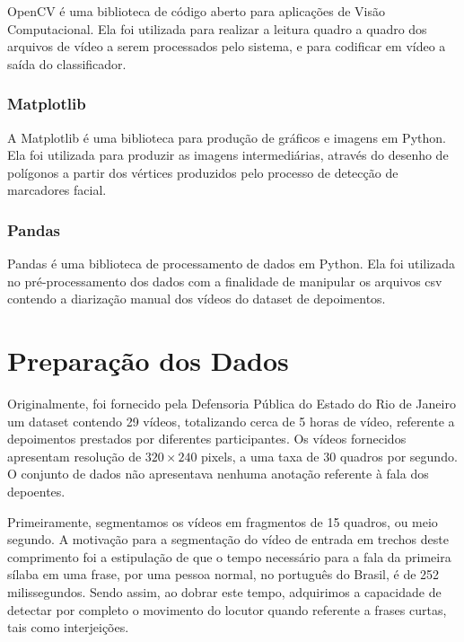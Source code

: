 OpenCV\cite{opencv_library} é uma biblioteca de código aberto para aplicações de Visão Computacional. Ela foi utilizada para realizar a leitura quadro a quadro dos arquivos de vídeo a serem processados pelo sistema, e para codificar em vídeo a saída do classificador.

\subsubsection{Matplotlib}

A Matplotlib\cite{Hunter:2007} é uma biblioteca para produção de gráficos e imagens em Python. Ela foi utilizada para produzir as imagens intermediárias, através do desenho de polígonos a partir dos vértices produzidos pelo processo de detecção de marcadores facial.

\subsubsection{Pandas}

Pandas\cite{mckinney-proc-scipy-2010} é uma biblioteca de processamento de dados em Python. Ela foi utilizada no pré-processamento dos dados com a finalidade de manipular os arquivos csv contendo a diarização manual dos vídeos do dataset de depoimentos.

\section{Preparação dos Dados}
\label{sec:preproc}

Originalmente, foi fornecido pela Defensoria Pública do Estado do Rio de Janeiro um dataset contendo 29 vídeos, totalizando cerca de 5 horas de vídeo, referente a depoimentos prestados por diferentes participantes. Os vídeos fornecidos apresentam resolução de $320\times240$ pixels, a uma taxa de 30 quadros por segundo. O conjunto de dados não apresentava nenhuma anotação referente à fala dos depoentes.

Primeiramente, segmentamos os vídeos em fragmentos de 15 quadros, ou meio segundo. A motivação para a segmentação do vídeo de entrada em trechos deste comprimento foi a estipulação de que o tempo necessário para a fala da primeira sílaba em uma frase, por uma pessoa normal, no português do Brasil, é de 252 milissegundos\cite{barbosaSyllabletimingBrazilianPortuguese2000}. Sendo assim, ao dobrar este tempo, adquirimos a capacidade de detectar por completo o movimento do locutor quando referente a frases curtas, tais como interjeições.

